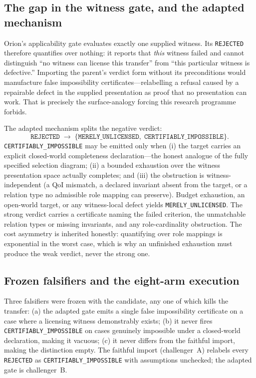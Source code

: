 \subsection{The gap in the witness gate, and the adapted mechanism}

Orion's applicability gate evaluates exactly one supplied witness. Its \texttt{REJECTED} therefore quantifies over nothing: it reports that \emph{this} witness failed and cannot distinguish ``no witness can license this transfer'' from ``this particular witness is defective.'' Importing the parent's verdict form without its preconditions would manufacture false impossibility certificates---relabelling a refusal caused by a repairable defect in the supplied presentation as proof that no presentation can work. That is precisely the surface-analogy forcing this research programme forbids.

The adapted mechanism splits the negative verdict:
\[
\texttt{REJECTED}\;\longrightarrow\;
\{\texttt{MERELY\_UNLICENSED},\;\texttt{CERTIFIABLY\_IMPOSSIBLE}\}.
\]
\texttt{CERTIFIABLY\_IMPOSSIBLE} may be emitted only when (i) the target carries an explicit closed-world completeness declaration---the honest analogue of the fully specified selection diagram; (ii) a bounded exhaustion over the witness presentation space actually completes; and (iii) the obstruction is witness-independent (a QoI mismatch, a declared invariant absent from the target, or a relation type no admissible role mapping can preserve). Budget exhaustion, an open-world target, or any witness-local defect yields \texttt{MERELY\_UNLICENSED}. The strong verdict carries a certificate naming the failed criterion, the unmatchable relation types or missing invariants, and any role-cardinality obstruction. The cost asymmetry is inherited honestly: quantifying over role mappings is exponential in the worst case, which is why an unfinished exhaustion must produce the weak verdict, never the strong one.

\subsection{Frozen falsifiers and the eight-arm execution}

Three falsifiers were frozen with the candidate, any one of which kills the transfer: (a) the adapted gate emits a single false impossibility certificate on a case where a licensing witness demonstrably exists; (b) it never fires \texttt{CERTIFIABLY\_IMPOSSIBLE} on cases genuinely impossible under a closed-world declaration, making it vacuous; (c) it never differs from the faithful import, making the distinction empty. The faithful import (challenger~A) relabels every \texttt{REJECTED} as \texttt{CERTIFIABLY\_IMPOSSIBLE} with assumptions unchecked; the adapted gate is challenger~B.

